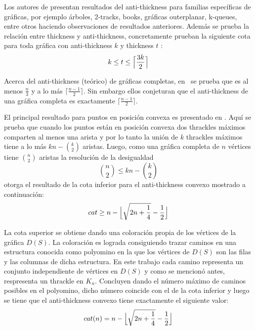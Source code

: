 %
Los autores de \cite{Dujmovic2017} presentan resultados
del anti-thickness para familias específicas de gráficas, por ejemplo árboles, 2-tracks, books, gráficas
outerplanar, k-queues, entre otros haciendo observaciones de resultados anteriores.
Además se prueba la relación entre thickness y anti-thickness, concretamente prueban
la siguiente cota para toda gráfica con anti-thickness $k$ y thickness $t$
: \[ k \leq t \leq \Bigl\lceil \frac{3k}{2}\Bigr\rceil \]

Acerca del anti-thickness (teórico) de gráficas completas, en~\cite{Dujmovic2017}
se prueba que es al menos $\frac{n}{3}$ y a lo más $\lceil \frac{n-1}{2} \rceil$.
Sin embargo ellos conjeturan que el anti-thickness de una gráfica completa es
exactamente $\lceil \frac{n-1}{2} \rceil$.

El principal resultado para puntos en posición convexa es presentado en \cite{Fabila-Monroy2018}.
Aquí se prueba que cuando los puntos están en posición convexa dos thrackles máximos
comparten al menos una arista y por lo tanto la unión de $k$ thrackles máximos tiene
a lo más $kn - \binom{k}{2}$ aristas. Luego, como una gráfica completa de $n$
vértices tiene $\binom{n}{2}$ aristas la resolución de la desigualdad
\[ \binom{n}{2} \leq kn - \binom{k}{2} \]
otorga el resultado de la cota inferior para el anti-thickness convexo mostrado
a continuación:
\[ cat \geq n - \Bigl\lfloor \sqrt{2n + \frac{1}{4}} - \frac{1}{2} \Bigr\rfloor \]

La cota superior se obtiene dando una coloración propia de los vértices de la gráfica
$D(S)$. La coloración es lograda consiguiendo trazar caminos en una
estructura conocida como polyomino en la que los vértices de $D(S)$ son las filas
y las columnas de dicha estructura. En este trabajo cada camino representa un
conjunto independiente de vértices en $D(S)$ y como se mencionó antes, respresenta
un thrackle en $K_n$. Concluyen dando el número máximo de caminos posibles en el
polyomino, dicho número coincide con el de la cota inferior y luego se tiene
que el anti-thickness convexo tiene exactamente el siguiente valor:
\[ cat(n) = n - \Bigl\lfloor \sqrt{2n + \frac{1}{4}} - \frac{1}{2} \Bigr\rfloor \]

